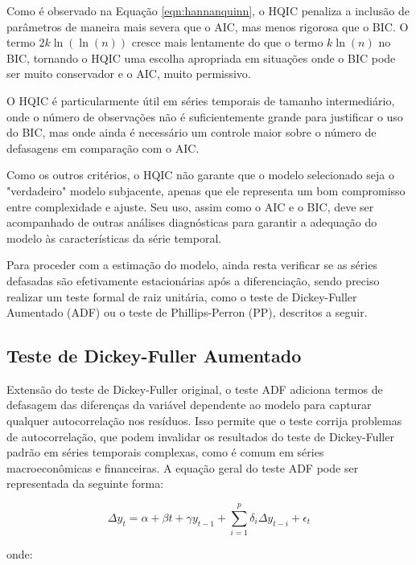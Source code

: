 \documentclass[12pt,oneside,a4paper,chapter=TITLE,english,brazil,sumario=abnt-6027-2012]{abntex2}
\begin{document}
Como é observado na Equação \ref{eqn:hannanquinn}, o HQIC penaliza a inclusão de parâmetros de maneira mais severa que o AIC, mas menos rigorosa que o BIC. O termo \( 2k \ln(\ln(n)) \) cresce mais lentamente do que o termo \( k \ln(n) \) no BIC, tornando o HQIC uma escolha apropriada em situações onde o BIC pode ser muito conservador e o AIC, muito permissivo.

O HQIC é particularmente útil em séries temporais de tamanho intermediário, onde o número de observações não é suficientemente grande para justificar o uso do BIC, mas onde ainda é necessário um controle maior sobre o número de defasagens em comparação com o AIC. 

Como os outros critérios, o HQIC não garante que o modelo selecionado seja o "verdadeiro" modelo subjacente, apenas que ele representa um bom compromisso entre complexidade e ajuste. Seu uso, assim como o AIC e o BIC, deve ser acompanhado de outras análises diagnósticas para garantir a adequação do modelo às características da série temporal.

Para proceder com a estimação do modelo, ainda resta verificar se as séries defasadas são efetivamente estacionárias após a diferenciação, sendo preciso realizar um teste formal de raiz unitária, como o teste de Dickey-Fuller Aumentado (ADF) ou o teste de Phillips-Perron (PP), descritos a seguir. 

\subsection{Teste de Dickey-Fuller Aumentado}

Extensão do teste de Dickey-Fuller original, o teste ADF adiciona termos de defasagem das diferenças da variável dependente ao modelo para capturar qualquer autocorrelação nos resíduos. Isso permite que o teste corrija problemas de autocorrelação, que podem invalidar os resultados do teste de Dickey-Fuller padrão em séries temporais complexas, como é comum em séries macroeconômicas e financeiras.  A equação geral do teste ADF pode ser representada da seguinte forma:

\begin{equation}
	\Delta y_t = \alpha + \beta t + \gamma y_{t-1} + \sum_{i=1}^{p} \delta_i \Delta y_{t-i} + \epsilon_t
\end{equation}

onde:
\end{document}
